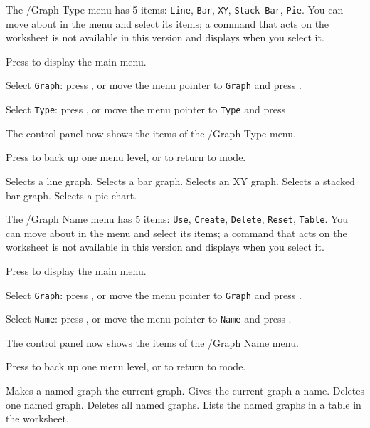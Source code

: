 The /Graph Type menu has 5 items: \texttt{Line}, \texttt{Bar}, \texttt{XY}, \texttt{Stack-Bar}, \texttt{Pie}.  You can move about in the menu and select its items; a command that acts on the worksheet is not available in this version and displays  when you select it.
\begin{Steps123}
\item Press  to display the main menu.
\item Select \texttt{Graph}: press , or move the menu pointer to \texttt{Graph} and press .
\item Select \texttt{Type}: press , or move the menu pointer to \texttt{Type} and press .
\item The control panel now shows the items of the /Graph Type menu.
\item Press  to back up one menu level, or  to return to  mode.
\end{Steps123}
\begin{Options}
 Selects a line graph.
 Selects a bar graph.
 Selects an XY graph.
 Selects a stacked bar graph.
 Selects a pie chart.
\end{Options}

The /Graph Name menu has 5 items: \texttt{Use}, \texttt{Create}, \texttt{Delete}, \texttt{Reset}, \texttt{Table}.  You can move about in the menu and select its items; a command that acts on the worksheet is not available in this version and displays  when you select it.
\begin{Steps123}
\item Press  to display the main menu.
\item Select \texttt{Graph}: press , or move the menu pointer to \texttt{Graph} and press .
\item Select \texttt{Name}: press , or move the menu pointer to \texttt{Name} and press .
\item The control panel now shows the items of the /Graph Name menu.
\item Press  to back up one menu level, or  to return to  mode.
\end{Steps123}
\begin{Options}
 Makes a named graph the current graph.
 Gives the current graph a name.
 Deletes one named graph.
 Deletes all named graphs.
 Lists the named graphs in a table in the worksheet.
\end{Options}

